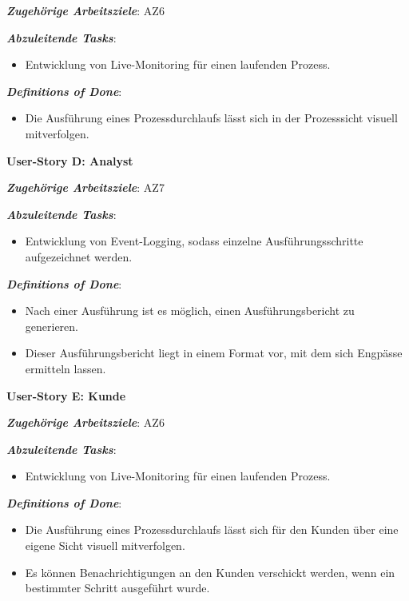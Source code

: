 \textbf{\textit{Zugehörige Arbeitsziele}}: AZ6

\textbf{\textit{Abzuleitende Tasks}}:

\begin{itemize}
    \item Entwicklung von Live-Monitoring für einen laufenden Prozess.
\end{itemize}

\textbf{\textit{Definitions of Done}}:

\begin{itemize}
    \item Die Ausführung eines Prozessdurchlaufs lässt sich in der Prozesssicht visuell mitverfolgen.
\end{itemize}


\noindent \textbf{User-Story D: Analyst}

\textbf{\textit{Zugehörige Arbeitsziele}}: AZ7

\textbf{\textit{Abzuleitende Tasks}}:

\begin{itemize}
    \item Entwicklung von Event-Logging, sodass einzelne Ausführungsschritte aufgezeichnet werden.
\end{itemize}

\textbf{\textit{Definitions of Done}}:

\begin{itemize}
    \item Nach einer Ausführung ist es möglich, einen Ausführungsbericht zu generieren.
    \item Dieser Ausführungsbericht liegt in einem Format vor, mit dem sich Engpässe ermitteln lassen.
\end{itemize}

\newpage

\noindent \textbf{User-Story E: Kunde}

\textbf{\textit{Zugehörige Arbeitsziele}}: AZ6

\textbf{\textit{Abzuleitende Tasks}}:

\begin{itemize}
    \item Entwicklung von Live-Monitoring für einen laufenden Prozess.
\end{itemize}

\textbf{\textit{Definitions of Done}}:

\begin{itemize}
    \item Die Ausführung eines Prozessdurchlaufs lässt sich für den Kunden über eine eigene Sicht visuell mitverfolgen.
    \item Es können Benachrichtigungen an den Kunden verschickt werden, wenn ein bestimmter Schritt ausgeführt wurde.
\end{itemize}


